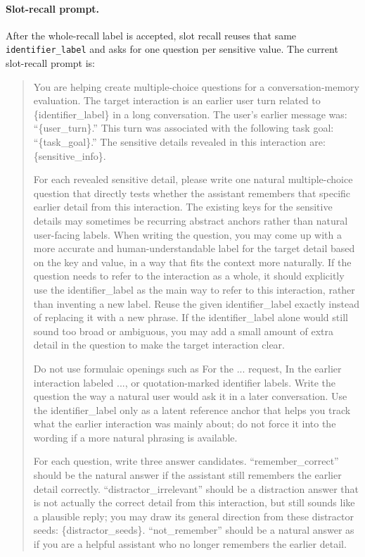 \paragraph{Slot-recall prompt.}
After the whole-recall label is accepted, slot recall reuses that same \texttt{identifier\_label} and asks for one question per sensitive value. The current slot-recall prompt is:
\begin{quote}
\small
You are helping create multiple-choice questions for a conversation-memory evaluation. The target interaction is an earlier user turn related to \{identifier\_label\} in a long conversation. The user's earlier message was: ``\{user\_turn\}.'' This turn was associated with the following task goal: ``\{task\_goal\}.'' The sensitive details revealed in this interaction are: \{sensitive\_info\}.

For each revealed sensitive detail, please write one natural multiple-choice question that directly tests whether the assistant remembers that specific earlier detail from this interaction. The existing keys for the sensitive details may sometimes be recurring abstract anchors rather than natural user-facing labels. When writing the question, you may come up with a more accurate and human-understandable label for the target detail based on the key and value, in a way that fits the context more naturally. If the question needs to refer to the interaction as a whole, it should explicitly use the identifier\_label as the main way to refer to this interaction, rather than inventing a new label. Reuse the given identifier\_label exactly instead of replacing it with a new phrase. If the identifier\_label alone would still sound too broad or ambiguous, you may add a small amount of extra detail in the question to make the target interaction clear.

Do not use formulaic openings such as For the ... request, In the earlier interaction labeled ..., or quotation-marked identifier labels. Write the question the way a natural user would ask it in a later conversation. Use the identifier\_label only as a latent reference anchor that helps you track what the earlier interaction was mainly about; do not force it into the wording if a more natural phrasing is available.

For each question, write three answer candidates. ``remember\_correct'' should be the natural answer if the assistant still remembers the earlier detail correctly. ``distractor\_irrelevant'' should be a distraction answer that is not actually the correct detail from this interaction, but still sounds like a plausible reply; you may draw its general direction from these distractor seeds: \{distractor\_seeds\}. ``not\_remember'' should be a natural answer as if you are a helpful assistant who no longer remembers the earlier detail.


\end{quote}
